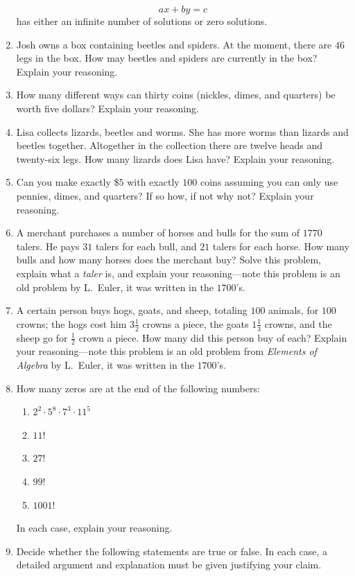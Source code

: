 \begin{problems}
\begin{enumerate}
\[
ax + by = c
\]
has either an infinite number of solutions or zero solutions.
\item Josh owns a box containing beetles and spiders. At the moment,
  there are $46$ legs in the box. How may beetles and spiders are
  currently in the box? Explain your reasoning.
\item How many different ways can thirty coins (nickles, dimes, and
  quarters) be worth five dollars? Explain your reasoning.
\item Lisa collects lizards, beetles and worms. She has more worms
  than lizards and beetles together. Altogether in the collection
  there are twelve heads and twenty-six legs. How many lizards does
  Lisa have?  Explain your reasoning.
\item Can you make exactly \$$5$ with exactly $100$ coins assuming you
  can only use pennies, dimes, and quarters? If so how, if not why
  not?  Explain your reasoning.
\item A merchant purchases a number of horses and bulls for the sum
  of $1770$ talers. He pays $31$ talers for each bull, and $21$ talers
  for each horse. How many bulls and how many horses does the merchant
  buy? Solve this problem, explain what a \textit{taler} is, and
  explain your reasoning---note this problem is an old problem by
  L.\ Euler, it was written in the $1700$'s.
\item A certain person buys hogs, goats, and sheep, totaling $100$
  animals, for $100$ crowns; the hogs cost him $3\frac{1}{2}$ crowns
  a piece, the goats $1\frac{1}{3}$ crowns, and the sheep go for
  $\frac{1}{2}$ crown a piece. How many did this person buy of each?
  Explain your reasoning---note this problem is an old problem from
  \textit{Elements of Algebra} by L.\ Euler, it was written in the
  $1700$'s.
\item How many zeros are at the end of the following numbers:
\begin{enumerate}
\item $2^2 \cdot 5^8 \cdot 7^3\cdot 11^5$
\item $11!$
\item $27!$
\item $99!$
\item $1001!$
\end{enumerate}
In each case, explain your reasoning.
\item Decide whether the following statements are true or false. In
  each case, a detailed argument and explanation must be given
  justifying your claim.
\begin{enumerate}

\end{enumerate}
\end{enumerate}
\end{problems}
